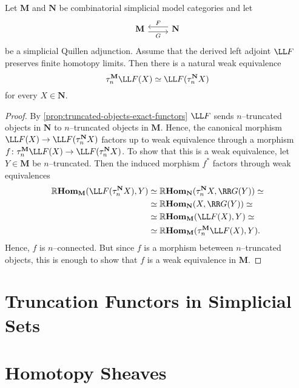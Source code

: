 \begin{proposition}\label{prop:left-exact-preserves-trunc}
  Let \(\mathbf M\) and \(\mathbf N\) be combinatorial simplicial model categories and let
  \[
  \begin{tikzcd}
    \mathbf M \arrow[r, shift right=.7ex, "G"'] & \arrow[l, shift right=.7ex, "F"'] \mathbf N
  \end{tikzcd}
  \]
  be a simplicial Quillen adjunction. Assume that the derived left adjoint \(\LL F\) preserves finite homotopy limits. Then there is a natural weak equivalence
  \[\trunc{n}^{\mathbf M} \LL F(X) \simeq \LL F(\trunc{n}^{\mathbf N} X)\]
  for every \(X\in\mathbf N\).
\end{proposition}
\begin{proof}
  By \autoref{prop:truncated-objects-exact-functors} \(\LL F\) sends \(n\)--truncated objects in \(\mathbf N\) to \(n\)--truncated objects in \(\mathbf M\). Hence, the canonical morphism \(\LL F(X)\to\LL F(\trunc{n}^{\mathbf N}X)\) factors up to weak equivalence through a morphism \(f\colon \trunc{n}^{\mathbf M}\LL F(X)\to \LL F(\trunc{n}^{\mathbf N}X)\). To show that this is a weak equivalence, let \(Y\in\mathbf M\) be \(n\)--truncated. Then the induced morphism \(f^{*}\) factors through weak equivalences
  \begin{align*}
    \RHom_{\mathbf M}(\LL F(\trunc{n}^{\mathbf N}X), Y)&\simeq \RHom_{\mathbf N}(\trunc{n}^{\mathbf N}X, \RR G(Y)) \simeq\\
                                                    &\simeq \RHom_{\mathbf N}(X, \RR G(Y)) \simeq \\
                                                    &\simeq \RHom_{\mathbf M}(\LL F(X), Y) \simeq \\
                                                    &\simeq \RHom_{\mathbf M}(\trunc{n}^{\mathbf M}\LL F(X), Y).
  \end{align*}
  Hence, \(f\) is \(n\)--connected. But since \(f\) is a morphism beteween \(n\)--truncated objects, this is enough to show that \(f\) is a weak equivalence in \(\mathbf M\).
\end{proof}

\section{Truncation Functors in Simplicial Sets}

\section{Homotopy Sheaves}

